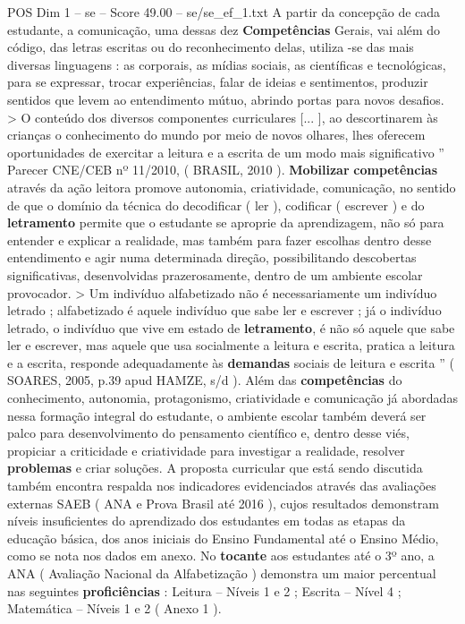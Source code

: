\begin{textsample}{POS Dim 1 – se – Score 49.00 – se/se\_ef\_1.txt}
A partir da concepção de cada estudante, a comunicação, uma dessas dez \textbf{Competências} Gerais, vai além do código, das letras escritas ou do reconhecimento delas, utiliza -se das mais diversas linguagens : as corporais, as mídias sociais, as científicas e tecnológicas, para se expressar, trocar experiências, falar de ideias e sentimentos, produzir sentidos que levem ao entendimento mútuo, abrindo portas para novos desafios. > O conteúdo dos diversos componentes curriculares [... ], ao descortinarem às crianças o conhecimento do mundo por meio de novos olhares, lhes oferecem oportunidades de exercitar a leitura e a escrita de um modo mais significativo ” Parecer CNE/CEB nº 11/2010, ( BRASIL, 2010 ). \textbf{Mobilizar} \textbf{competências} através da ação leitora promove autonomia, criatividade, comunicação, no sentido de que o domínio da técnica do decodificar ( ler ), codificar ( escrever ) e do \textbf{letramento} permite que o estudante se aproprie da aprendizagem, não só para entender e explicar a realidade, mas também para fazer escolhas dentro desse entendimento e agir numa determinada direção, possibilitando descobertas significativas, desenvolvidas prazerosamente, dentro de um ambiente escolar provocador. > Um indivíduo alfabetizado não é necessariamente um indivíduo letrado ; alfabetizado é aquele indivíduo que sabe ler e escrever ; já o indivíduo letrado, o indivíduo que vive em estado de \textbf{letramento}, é não só aquele que sabe ler e escrever, mas aquele que usa socialmente a leitura e escrita, pratica a leitura e a escrita, responde adequadamente às \textbf{demandas} sociais de leitura e escrita ” ( SOARES, 2005, p.39 apud HAMZE, s/d ).
Além das \textbf{competências} do conhecimento, autonomia, protagonismo, criatividade e comunicação já abordadas nessa formação integral do estudante, o ambiente escolar também deverá ser palco para desenvolvimento do pensamento científico e, dentro desse viés, propiciar a criticidade e criatividade para investigar a realidade, resolver \textbf{problemas} e criar soluções.
A proposta curricular que está sendo discutida também encontra respalda nos indicadores evidenciados através das avaliações externas SAEB ( ANA e Prova Brasil até 2016 ), cujos resultados demonstram níveis insuficientes do aprendizado dos estudantes em todas as etapas da educação básica, dos anos iniciais do Ensino Fundamental até o Ensino Médio, como se nota nos dados em anexo.
No \textbf{tocante} aos estudantes até o 3º ano, a ANA ( Avaliação Nacional da Alfabetização ) demonstra um maior percentual nas seguintes \textbf{proficiências} : Leitura – Níveis 1 e 2 ; Escrita – Nível 4 ; Matemática – Níveis 1 e 2 ( Anexo 1 ).

\end{textsample}
